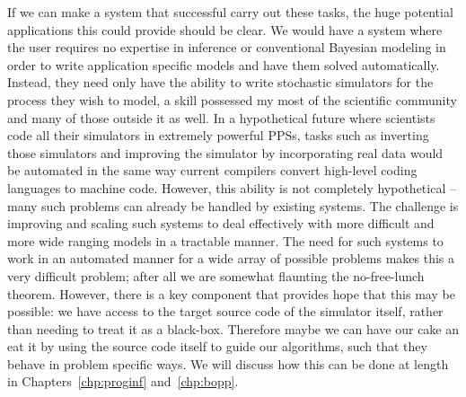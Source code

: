 If we can make a system that successful carry out these tasks, 
the huge potential applications this could provide should be clear. We would have a 
system where the user requires no expertise in inference or conventional
Bayesian modeling in order to write application specific models and have them solved automatically.
Instead, they need only have the ability to write stochastic simulators for the process they wish to
model, a skill possessed my most of the scientific community and many of those outside it as well.
In a hypothetical future where scientists
code all their simulators in extremely powerful PPSs, tasks such as
inverting those simulators and improving the simulator by incorporating real data would
be automated in the same way current compilers convert high-level coding languages to machine code.  
However, this ability is not completely
hypothetical -- many such problems can already be handled by existing systems.  The challenge
is improving and scaling such systems to deal effectively with more difficult and more wide ranging models
in a tractable manner.  The need for such systems to work in an automated manner for a wide array
of possible problems makes this a very difficult problem; after all we are somewhat flaunting the no-free-lunch
theorem.  However, there is a key component that provides hope that this may be possible: we have access
to the target source code of the simulator itself, rather than needing to treat it as a black-box.  Therefore
maybe we can have our cake an eat it by using the source code itself to guide our algorithms, such that
they behave in problem specific ways.  We will discuss how this can be done at length in 
Chapters~\ref{chp:proginf} and~\ref{chp:bopp}.